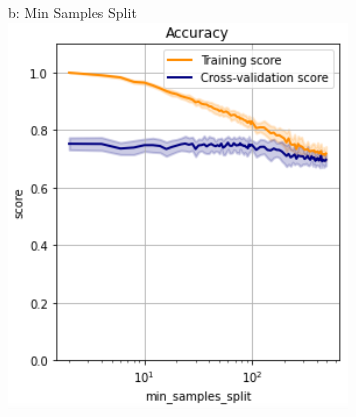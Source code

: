 \documentclass{article}
\begin{document}
\begin{figure}
\begin{subfigure}{.24\textwidth}
	\end{subfigure}%
	\begin{subfigure}{.24\textwidth}
		b: Min Samples Split
		\centering
		\includegraphics[width=\linewidth]{poland_decision_min_samples_split_accuracy.png}
		

\end{subfigure}
\end{figure}
\end{document}
